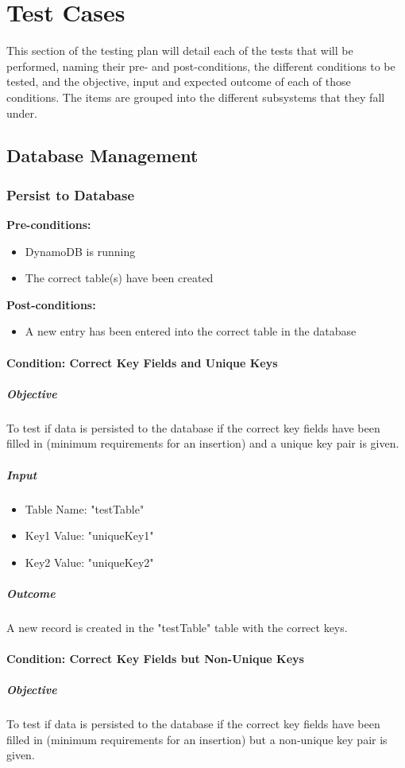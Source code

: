 \documentclass{article}
\begin{document}
\section{Test Cases}
	This section of the testing plan will detail each of the tests that will be performed, naming their pre- and post-conditions, the different conditions to be tested, and the objective, input and expected outcome of each of those conditions. The items are grouped into the different subsystems that they fall under.
	
	\subsection{Database Management}
		\subsubsection{Persist to Database}
			\textbf{Pre-conditions:}
			\begin{itemize}
				\item DynamoDB is running
				\item The correct table(s) have been created
			\end{itemize}
			\textbf{Post-conditions:}
			\begin{itemize}
				\item A new entry has been entered into the correct table in the database
			\end{itemize}
			
			\paragraph{Condition: Correct Key Fields and Unique Keys}
				\subparagraph{Objective}
					To test if data is persisted to the database if the correct key fields have been filled in (minimum requirements for an insertion) and a unique key pair is given.
				
				\subparagraph{Input}
					\begin{itemize}
						\item Table Name: "testTable"
						\item Key1 Value: "uniqueKey1"
						\item Key2 Value: "uniqueKey2"
					\end{itemize}
				
				\subparagraph{Outcome}
					A new record is created in the "testTable" table with the correct keys.
			
			\paragraph{Condition: Correct Key Fields but Non-Unique Keys}	
				\subparagraph{Objective}
					To test if data is persisted to the database if the correct key fields have been filled in (minimum requirements for an insertion) but a non-unique key pair is given.
					
\end{document}
